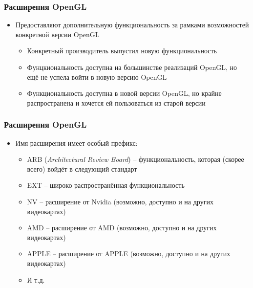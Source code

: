\documentclass{beamer}
\begin{document}
\begin{frame}[fragile]
\frametitle{Расширения OpenGL}
\begin{itemize}
\item Предоставляют дополнительную функциональность за рамками возможностей конкретной версии OpenGL
\pause
\begin{itemize}
\item Конкретный производитель выпустил новую функциональность
\pause
\item Фунцкиональность доступна на большинстве реализаций OpenGL, но ещё не успела войти в новую версию OpenGL
\pause
\item Функциональность доступна в новой версии OpenGL, но крайне распространена и хочется ей пользоваться из старой версии
\end{itemize}
\end{itemize}
\end{frame}

\begin{frame}[fragile]
\frametitle{Расширения OpenGL}
\begin{itemize}
\item Имя расширения имеет особый префикс:
\begin{itemize}
\item ARB (\textit{Architectural Review Board}) -- функциональность, которая (скорее всего) войдёт в следующий стандарт
\item EXT -- широко распространённая функциональность
\item NV -- расширение от Nvidia (возможно, доступно и на других видеокартах)
\item AMD -- расширение от AMD (возможно, доступно и на других видеокартах)
\item APPLE -- расширение от APPLE (возможно, доступно и на других видеокартах)
\item И т.д.
\end{itemize}
\end{itemize}
\end{frame}
\end{document}
